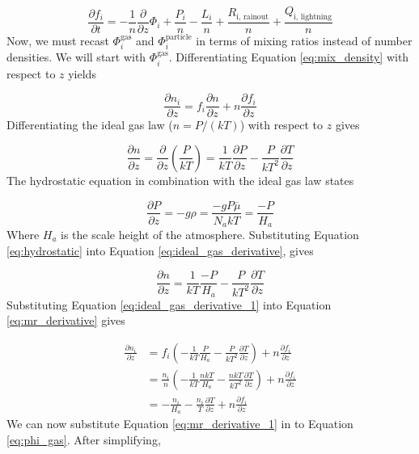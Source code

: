 \documentclass{article}
\begin{document}
\begin{equation} \label{eq:continuity_simple}
  \boxed{\frac{\partial f_{i}}{\partial t} = - \frac{1}{n}\frac{\partial}{\partial z}\Phi_{i} + \frac{P_{i}}{n} - \frac{L_{i}}{n} + \frac{R_{\text{i,\ rainout}}}{n} + \frac{Q_{\text{i,\ lightning}}}{n}}
\end{equation}
Now, we must recast $\Phi_{i}^\text{gas}$ and $\Phi_{i}^\text{particle}$ in terms of mixing ratios instead of number densities. We will start with $\Phi_{i}^\text{gas}$. Differentiating Equation \eqref{eq:mix_density} with respect to $z$ yields

\begin{equation} \label{eq:mr_derivative}
  \frac{\partial n_i}{\partial z} = f_i \frac{\partial n}{\partial z} + n \frac{\partial f_i}{\partial z}
\end{equation}
Differentiating the ideal gas law ($n = P/(kT)$) with respect to $z$ gives

\begin{equation} \label{eq:ideal_gas_derivative}
  \frac{\partial n}{\partial z} = \frac{\partial}{\partial z}\left(\frac{P}{kT}\right)
= \frac{1}{kT}\frac{\partial P}{\partial z} - \frac{P}{kT^2} \frac{\partial T}{\partial z}
\end{equation}
The hydrostatic equation in combination with the ideal gas law states

\begin{equation} \label{eq:hydrostatic}
  \frac{\partial P}{\partial z} = -g \rho = \frac{-g P \overline{\mu}}{N_a k T} = \frac{-P}{H_a}
\end{equation}
Where $H_a$ is the scale height of the atmosphere. Substituting Equation \eqref{eq:hydrostatic} into Equation \eqref{eq:ideal_gas_derivative}, gives

\begin{equation} \label{eq:ideal_gas_derivative_1}
  \frac{\partial n}{\partial z} = \frac{1}{kT} \frac{-P}{H_a} - \frac{P}{kT^2} \frac{\partial T}{\partial z}
\end{equation}
Substituting Equation \eqref{eq:ideal_gas_derivative_1} into Equation \eqref{eq:mr_derivative} gives

\begin{align}
  \frac{\partial n_i}{\partial z} &= f_i \left(-\frac{1}{kT} \frac{P}{H_a} - \frac{P}{kT^2} \frac{\partial T}{\partial z}\right) + n \frac{\partial f_i}{\partial z} \nonumber \\ 
  &= \frac{n_i}{n} \left(-\frac{1}{kT} \frac{nkT}{H_a} - \frac{nkT}{kT^2} \frac{\partial T}{\partial z}\right) + n \frac{\partial f_i}{\partial z} \nonumber \\
  &= -\frac{n_i}{H_a} - \frac{n_i}{T} \frac{\partial T}{\partial z} + n \frac{\partial f_i}{\partial z} \label{eq:mr_derivative_1}
\end{align}
We can now substitute Equation \eqref{eq:mr_derivative_1} in to Equation \eqref{eq:phi_gas}. After simplifying,
\end{document}
